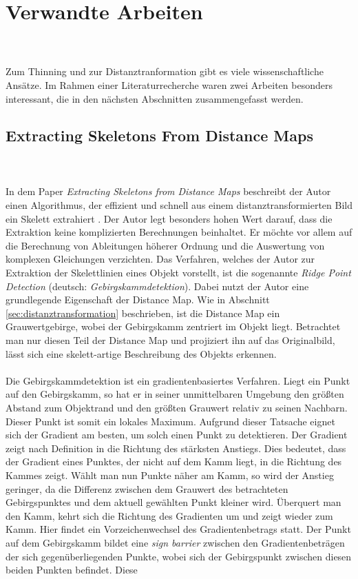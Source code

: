 \chapter{Verwandte Arbeiten}
\\\\
Zum Thinning und zur Distanztranformation gibt es viele wissenschaftliche Ansätze. 
Im Rahmen einer Literaturrecherche waren zwei Arbeiten besonders interessant, die in den nächsten Abschnitten zusammengefasst werden. 
\section{Extracting Skeletons From Distance Maps}
\\\\ 
In dem Paper \emph{Extracting Skeletons from Distance Maps} beschreibt der Autor einen Algorithmus, der effizient und schnell
aus einem distanztransformierten Bild ein Skelett extrahiert \cite{extracting_skeletons_distancemaps}. Der Autor legt besonders hohen Wert darauf, dass die Extraktion keine komplizierten Berechnungen beinhaltet. Er möchte vor allem auf die Berechnung
von Ableitungen höherer Ordnung und die Auswertung von komplexen Gleichungen verzichten. Das Verfahren, welches der Autor zur 
Extraktion der Skelettlinien eines Objekt vorstellt, ist die sogenannte \emph{Ridge Point Detection} (deutsch: \emph{Gebirgskammdetektion}). Dabei nutzt der Autor eine grundlegende Eigenschaft der Distance Map. Wie in Abschnitt \ref{sec:distanztransformation} beschrieben, ist die Distance Map ein Grauwertgebirge, wobei der Gebirgskamm zentriert im Objekt liegt. Betrachtet man nur diesen Teil der Distance Map und projiziert ihn auf das Originalbild, 
lässt sich eine skelett-artige Beschreibung des Objekts erkennen.\\\\
Die Gebirgskammdetektion ist ein gradientenbasiertes Verfahren. Liegt ein Punkt auf den Gebirgskamm, so hat er in 
seiner unmittelbaren Umgebung den größten Abstand zum Objektrand und den größten Grauwert relativ zu seinen Nachbarn. Dieser Punkt ist somit ein lokales Maximum. Aufgrund dieser Tatsache eignet  sich der Gradient am besten, um solch einen Punkt zu detektieren. Der Gradient zeigt nach Definition in die Richtung des stärksten Anstiegs. Dies bedeutet, dass der Gradient eines Punktes, der nicht auf dem Kamm liegt, in die Richtung des Kammes zeigt. Wählt man nun Punkte näher am Kamm, so wird der Anstieg
geringer, da die Differenz zwischen dem Grauwert des betrachteten Gebirgspunktes und dem aktuell gewählten Punkt kleiner wird. Überquert man den Kamm, kehrt sich die Richtung des Gradienten um und zeigt wieder zum Kamm. Hier findet ein Vorzeichenwechsel des Gradientenbetrags statt. Der Punkt auf dem Gebirgskamm bildet eine \emph{sign barrier} zwischen den Gradientenbeträgen der sich gegenüberliegenden Punkte, wobei sich der Gebirgspunkt zwischen diesen beiden Punkten befindet. Diese
